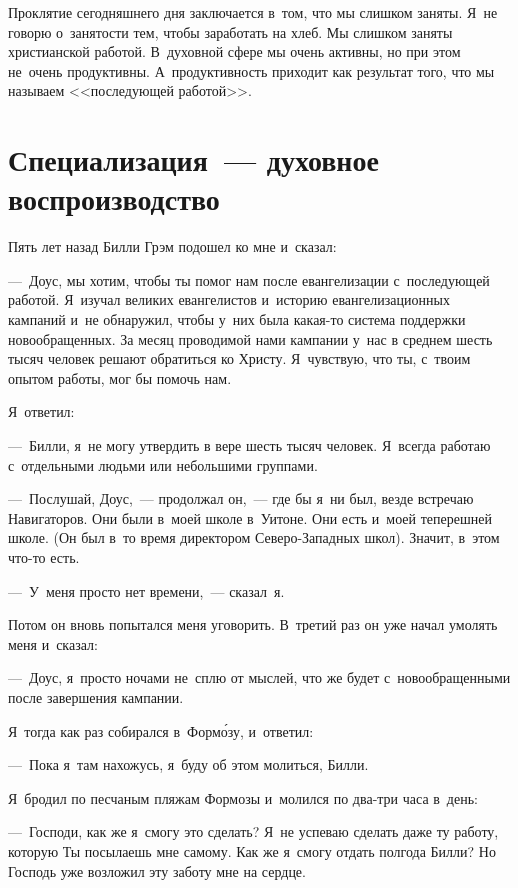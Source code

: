 \documentclass[12pt,article,a4paper,fittopage]{ncc}
\begin{document}
\begin{multicols}{2}
Проклятие сегодняшнего дня заключается в~том, что мы слишком заняты. Я~не говорю о~занятости тем, чтобы заработать на хлеб. Мы слишком заняты христианской работой. В~духовной сфере мы очень активны, но при этом не~очень продуктивны. А~продуктивность приходит как результат того, что мы называем <<последующей работой>>.

\pagestyle{lheadings}

\section*{Специализация~--- духовное воспроизводство}

Пять лет назад Билли Грэм подошел ко мне и~сказал:

---~Доус, мы хотим, чтобы ты помог нам после евангелизации с~последующей работой. Я~изучал великих евангелистов и~историю евангелизационных кампаний и~не обнаружил, чтобы у~них была какая-то система поддержки новообращенных. За месяц проводимой нами кампании у~нас в среднем шесть тысяч человек решают обратиться ко Христу. Я~чувствую, что ты, с~твоим опытом работы, мог бы помочь нам.

Я~ответил:

---~Билли, я~не могу утвердить в вере шесть тысяч человек. Я~всегда работаю с~отдельными людьми или небольшими группами.

---~Послушай, Доус,~--- продолжал он,~--- где бы я~ни был, везде встречаю Навигаторов. Они были в~моей школе в~Уитоне. Они есть и~моей теперешней школе. (Он был в~то время директором Северо-Западных школ). Значит, в~этом что-то есть.

---~У~меня просто нет времени,~--- сказал~я.

Потом он вновь попытался меня уговорить. В~третий раз он уже начал умолять меня и~сказал:

---~Доус, я~просто ночами не~сплю от мыслей, что же будет с~новообращенными после завершения кампании.

Я~тогда как раз собирался в~Форм\'{о}зу, и~ответил:

---~Пока я~там нахожусь, я~буду об этом молиться, Билли.

Я~бродил по песчаным пляжам Формозы и~молился по два-три часа в~день:

---~Господи, как же я~смогу это сделать? Я~не успеваю сделать даже ту работу, которую Ты посылаешь мне самому. Как же я~смогу отдать полгода Билли? Но Господь уже возложил эту заботу мне на сердце.


\end{multicols}
\end{document}
